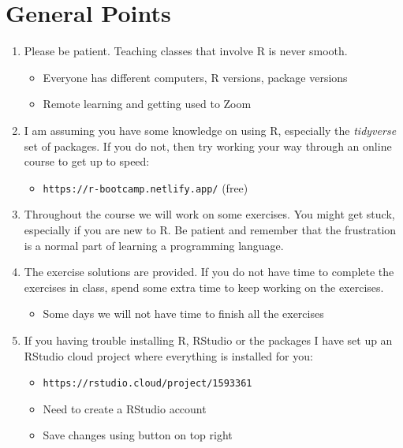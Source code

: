 \documentclass[
]{book}
\providecommand{\tightlist}{%
  \setlength{\itemsep}{0pt}\setlength{\parskip}{0pt}}
\begin{document}
\hypertarget{general-points}{%
\section{General Points}\label{general-points}}

\begin{enumerate}
\def\labelenumi{\arabic{enumi}.}
\tightlist
\item
  Please be patient. Teaching classes that involve R is never smooth.

  \begin{itemize}
  \tightlist
  \item
    Everyone has different computers, R versions, package versions
  \item
    Remote learning and getting used to Zoom
  \end{itemize}
\item
  I am assuming you have some knowledge on using R, especially the \emph{tidyverse} set of packages. If you do not, then try working your way through an online course to get up to speed:

  \begin{itemize}
  \tightlist
  \item
    \texttt{https://r-bootcamp.netlify.app/} (free)
  \end{itemize}
\item
  Throughout the course we will work on some exercises. You might get stuck, especially if you are new to R. Be patient and remember that the frustration is a normal part of learning a programming language.
\item
  The exercise solutions are provided. If you do not have time to complete the exercises in class, spend some extra time to keep working on the exercises.

  \begin{itemize}
  \tightlist
  \item
    Some days we will not have time to finish all the exercises
  \end{itemize}
\item
  If you having trouble installing R, RStudio or the packages I have set up an RStudio cloud project where everything is installed for you:

  \begin{itemize}
  \tightlist
  \item
    \texttt{https://rstudio.cloud/project/1593361}
  \item
    Need to create a RStudio account
  \item
    Save changes using button on top right
  \end{itemize}
\end{enumerate}
\end{document}

